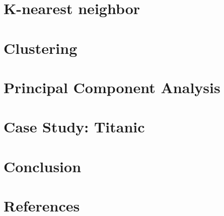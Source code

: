 
 \section[Knn]{K-nearest neighbor}



 \section[Clust]{Clustering}





 \section[PCA]{Principal Component Analysis}



 \section[Case]{Case Study: Titanic}




 \section[End]{Conclusion}




 \section[Refs]{References}
